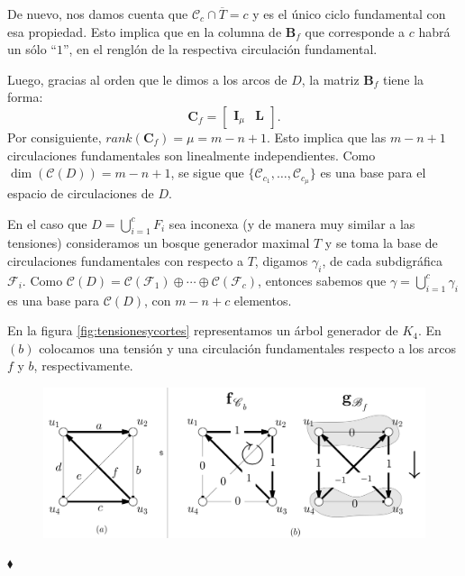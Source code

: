De nuevo, nos damos cuenta que $\mathscr{C}_{c} \cap \overline{T} = c$ y es el único ciclo fundamental con esa propiedad. Esto implica que en la columna de $\mathbf{B}_{f}$ que corresponde a $c$ habrá un sólo ``$1$'', en el renglón de la respectiva circulación fundamental.

Luego, gracias al orden que le dimos a los arcos de $D$, la matriz $\mathbf{B}_{f}$ tiene la forma:
$$
\mathbf{C}_{f} = \begin{bmatrix}
\mathbf{I}_{\mu} & \mathbf{L} 
\end{bmatrix}.
$$
Por consiguiente, $rank(\mathbf{C}_{f}) = \mu = m - n + 1$. Esto implica que las $m - n +1$ circulaciones fundamentales son linealmente independientes. Como $\dim(\mathcal{C}(D)) = m - n +1$, se sigue que $\{\mathscr{C}_{c_{1}}, \ldots, \mathscr{C}_{c_{\mu}}\}$ es una base para el espacio de circulaciones de $D$.

En el caso que $D = \bigcup_{i = 1}^{c} F_{i}$ sea inconexa (y de manera muy similar a las tensiones) consideramos  un bosque generador maximal $T$ y se toma la base de circulaciones fundamentales con respecto a $T$, digamos $\gamma_{i}$, de cada subdigráfica $\mathcal{F}_{i}$. Como $\mathcal{C}(D) = \mathcal{C}(\mathcal{F}_{1}) \oplus \cdots \oplus \mathcal{C}(\mathcal{F}_{c})$, entonces sabemos que $\gamma = \bigcup_{i =1}^{c}\gamma_{i}$ es una base para $\mathcal{C}(D)$, con $m - n + c$ elementos.

\begin{ejem}
En la figura \ref{fig:tensionesycortes} representamos un árbol generador de $K_{4}$. En $(b)$ colocamos una tensión y una circulación fundamentales respecto a los arcos $f$ y $b$, respectivamente. 

\begin{figure}[H]
    \centering
    \includegraphics[scale=0.2]{img/imgchapter3/tensionescirculacionesfundamentales.jpg}
    \caption{}
    \label{fig:tensionescirculacionesfund}
\end{figure}
\hfill $\blacklozenge$
\end{ejem}
